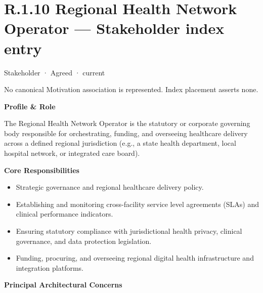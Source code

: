 \section*{R.1.10 Regional Health Network Operator — Stakeholder index entry}
\label{navigation:R.1.10}

\label{element:e76216c494fa4500bb80eda6f83513c1}
{\small Stakeholder · Agreed · current}\par
No canonical Motivation association is represented. Index placement asserts none.\par

\par\medskip\textbf{Profile \& Role}\par


The Regional Health Network Operator is the statutory or corporate governing body responsible for orchestrating, funding, and overseeing healthcare delivery across a defined regional jurisdiction (e.g., a state health department, local hospital network, or integrated care board).



\par\medskip\textbf{Core Responsibilities}\par


\begin{itemize}


\item Strategic governance and regional healthcare delivery policy.

\item Establishing and monitoring cross-facility service level agreements (SLAs) and clinical performance indicators.

\item Ensuring statutory compliance with jurisdictional health privacy, clinical governance, and data protection legislation.

\item Funding, procuring, and overseeing regional digital health infrastructure and integration platforms.

\end{itemize}


\par\medskip\textbf{Principal Architectural Concerns}\par


